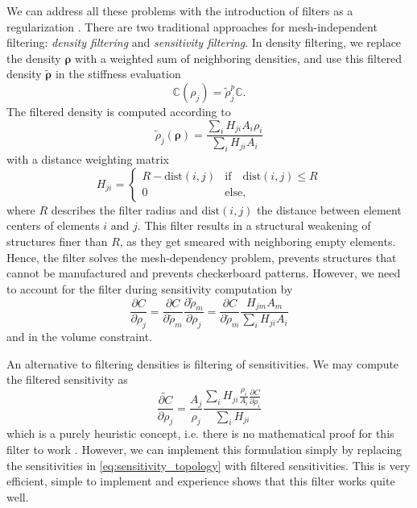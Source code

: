 We can address all these problems with the introduction of filters as a regularization \cite{Harzheim2014, Lazarov2011}. There are two traditional approaches for mesh-independent filtering: \emph{density filtering} and \emph{sensitivity filtering}. In density filtering, we replace the density $\pmb{\rho}$ with a weighted sum of neighboring densities, and use this filtered density $\tilde{\pmb{\rho}}$ in the stiffness evaluation
\begin{equation}
    \mathbb{C}(\rho_j)= \tilde{\rho}_j^p \mathbb{C}.
\end{equation}
The filtered density is computed according to 
\begin{equation}
    \tilde{\rho}_j (\pmb{\rho}) = \frac{\sum_i H_{ji} A_i \rho_i}{\sum_i H_{ji} A_i}
\end{equation}
with a distance weighting matrix
\begin{equation}
    H_{ji} = 
    \begin{cases}
        R-\textrm{dist}(i,j) & \text{if} \quad \textrm{dist}(i,j) \le R \\
        0 & \text{else},
    \end{cases}
\end{equation}
where $R$ describes the filter radius and $\textrm{dist}(i,j)$ the distance between element centers of elements $i$ and $j$. This filter results in a structural weakening of structures finer than $R$, as they get smeared with neighboring empty elements. Hence, the filter solves the mesh-dependency problem, prevents structures that cannot be manufactured and prevents checkerboard patterns. However, we need to account for the filter during sensitivity computation by 
\begin{equation}
    \frac{\partial C}{\partial \rho_j} 
    = \frac{\partial C}{\partial \tilde{\rho}_m} \frac{\partial \tilde{\rho}_m}{\partial \rho_j}
    = \frac{\partial C}{\partial \tilde{\rho}_m}  \frac{H_{jm} A_m }{\sum_i H_{ji} A_i}
\end{equation}
and in the volume constraint.

An alternative to filtering densities is filtering of sensitivities. We may compute the filtered sensitivity as
\begin{equation}
    \widetilde{\frac{\partial C}{\partial \rho_j}} = \frac{A_j}{\rho_j} \frac{\sum_i H_{ji} \frac{\rho_i}{A_i} \frac{\partial C}{\partial \rho_i}}{\sum_i H_{ji}}
\end{equation}
which is a purely heuristic concept, i.e. there is no mathematical proof for this filter to work \cite{Sigmund1998, Sigmund2007}. 
However, we can implement this formulation simply by replacing the sensitivities in \eqref{eq:sensitivity_topology} with filtered sensitivities. 
This is very efficient, simple to implement and experience shows that this filter works quite well.

